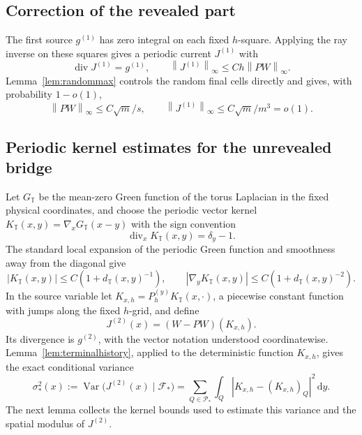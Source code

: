 \documentclass[11pt]{article}
\theoremstyle{definition}
\theoremstyle{remark}
\numberwithin{equation}{section}
\newcommand{\T}{\mathbb T}
\newcommand{\F}{\mathcal F}
\newcommand{\pr}{\mathcal P}
\newcommand{\divv}{\operatorname{div}}
\newcommand{\norm}[1]{\left\|#1\right\|}
\newcommand{\dd}{\,\mathrm d}
\begin{document}
\subsection{Correction of the revealed part}
\label{not:terminalcurrents}
The first source $g^{(1)}$ has zero integral on each fixed $h$-square.
Applying the ray inverse on these squares gives a periodic current
$J^{(1)}$ with
\[
 \divv J^{(1)}=g^{(1)},\qquad
 \norm{J^{(1)}}_\infty\le Ch\norm{PW}_\infty.
\]
Lemma~\ref{lem:randommax} controls the random final cells directly and
gives, with probability $1-o(1)$,
\begin{equation}\label{eq:smallfirst}
 \norm{PW}_\infty\le C\sqrt m/s,\qquad
 \norm{J^{(1)}}_\infty\le C\sqrt m/m^3=o(1).
\end{equation}

\subsection{Periodic kernel estimates for the unrevealed bridge}
\label{not:periodicgreen}
Let $G_{\T}$ be the mean-zero Green function of the torus
Laplacian in the fixed physical coordinates, and choose
the periodic vector kernel
$K_{\T}(x,y)=\nabla_xG_{\T}(x-y)$ with the sign convention
\[
 \divv_xK_{\T}(x,y)=\delta_y-1.
\]
The standard local expansion of the periodic Green function
and smoothness away from the diagonal give
\begin{equation}\label{eq:periodicK}
 |K_{\T}(x,y)|\le C(1+d_{\T}(x,y)^{-1}),\qquad
 |\nabla_yK_{\T}(x,y)|\le C(1+d_{\T}(x,y)^{-2}).
\end{equation}
In the source variable let
$K_{x,h}=P_h^{(y)}K_{\T}(x,\cdot)$, a piecewise constant
function with jumps along the fixed $h$-grid, and define
\[
 J^{(2)}(x)=(W-PW)(K_{x,h}).
\]
Its divergence is $g^{(2)}$, with the vector notation understood
coordinatewise. Lemma~\ref{lem:terminalhistory}, applied to the
deterministic function $K_{x,h}$, gives the exact conditional variance
\begin{equation}\label{eq:terminalvar}
 \sigma_*^2(x)
 :=\operatorname{Var}\bigl(J^{(2)}(x)\mid\F_*\bigr)
 =\sum_{Q\in\pr_*}\int_Q
       |K_{x,h}-(K_{x,h})_Q|^2\dd y.
\end{equation}
The next lemma collects the kernel bounds used to estimate this
variance and the spatial modulus of $J^{(2)}$.
\end{document}
